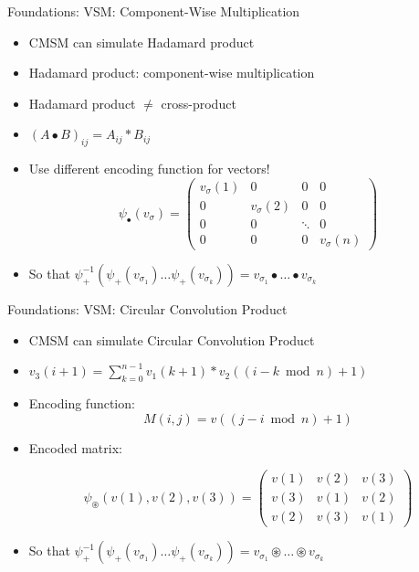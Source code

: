 \documentclass[12pt,a4paper]{beamer}
\begin{document}
\begin{frame}{Foundations: VSM: Component-Wise Multiplication}
\begin{itemize}
\item CMSM can simulate Hadamard product
\item Hadamard product: component-wise multiplication
\item Hadamard product $\neq$ cross-product
\item $(A \bullet B)_{ij} = A_{ij} * B_{ij}$
\item Use different encoding function for vectors!
$$  \psi_{\bullet}(v_{\sigma}) =
\left( \begin{array}{cccc}
v_{\sigma}(1) & 0 & 0 & 0 \\
0 & v_{\sigma}(2) & 0 & 0 \\
0 & 0 & \ddots & 0 \\
0 & 0 & 0 & v_{\sigma}(n) \end{array} \right) $$

\item So that $\psi_{+}^{-1} (\psi_{+}(v_{\sigma_{1}}) \ldots \psi_{+}(v_{\sigma_{k}})) = v_{\sigma_{1}} \bullet \ldots \bullet v_{\sigma_{k}}$


\end{itemize}
\end{frame}

\begin{frame}{Foundations: VSM: Circular Convolution Product}
\begin{itemize}
\item CMSM can simulate Circular Convolution Product 
\item $v_{3}(i+1) = \sum_{k=0}^{n-1}{v_{1} (k+1) * v_{2} ( (i-k \bmod{n}) +1) }$
\item Encoding function:
$$  M(i,j) = v ((j - i \bmod{n} ) +1) $$
\item Encoded matrix:

$$\psi_{ \circledast } ( v(1), v(2), v(3) ) =
\left( \begin{array}{ccc}
v(1) & v(2) & v(3)  \\
v(3) & v(1) & v(2)  \\
v(2) & v(3) & v(1)  \end{array} \right)
$$

\item So that $\psi_{+}^{-1} (\psi_{+}(v_{\sigma_{1}}) \ldots \psi_{+}(v_{\sigma_{k}})) = v_{\sigma_{1}} \circledast \ldots \circledast v_{\sigma_{k}}$

\end{itemize}
\end{frame}
\end{document}
